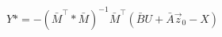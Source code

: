 \documentclass{article}
\begin{document}
\thispagestyle{empty}

$$
Y* = -(\bar{M}^\top * \bar{M})^{-1}\bar{M}^\top(\bar{B} U + \bar{A}\vec{z}_0 - X)
$$
\end{document}
